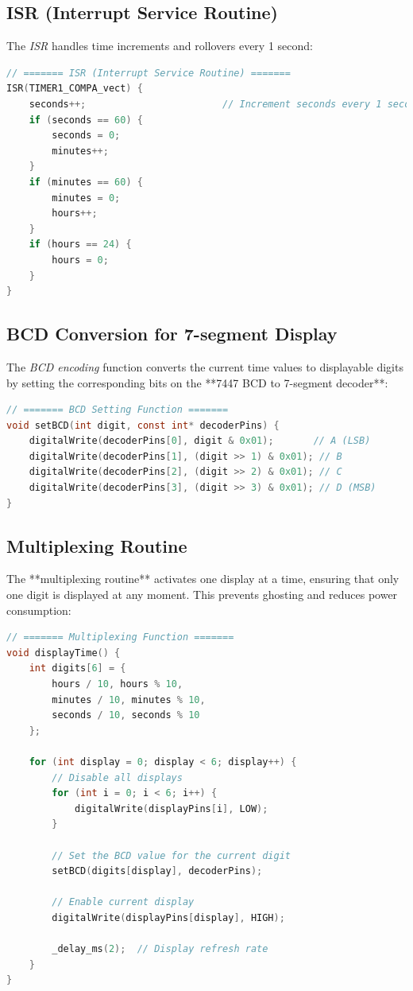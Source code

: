 \documentclass{article}
\begin{document}
\subsection{ISR (Interrupt Service Routine)}
The \textit{ISR} handles time increments and rollovers every 1 second:
\begin{lstlisting}[language=C]
// ======= ISR (Interrupt Service Routine) =======
ISR(TIMER1_COMPA_vect) {
    seconds++;                        // Increment seconds every 1 second
    if (seconds == 60) {
        seconds = 0;
        minutes++;
    }
    if (minutes == 60) {
        minutes = 0;
        hours++;
    }
    if (hours == 24) {
        hours = 0;
    }
}
\end{lstlisting}

\subsection{BCD Conversion for 7-segment Display}
The \textit{BCD encoding} function converts the current time values to displayable digits by setting the corresponding bits on the **7447 BCD to 7-segment decoder**:
\begin{lstlisting}[language=C]
// ======= BCD Setting Function =======
void setBCD(int digit, const int* decoderPins) {
    digitalWrite(decoderPins[0], digit & 0x01);       // A (LSB)
    digitalWrite(decoderPins[1], (digit >> 1) & 0x01); // B
    digitalWrite(decoderPins[2], (digit >> 2) & 0x01); // C
    digitalWrite(decoderPins[3], (digit >> 3) & 0x01); // D (MSB)
}
\end{lstlisting}

\subsection{Multiplexing Routine}
The **multiplexing routine** activates one display at a time, ensuring that only one digit is displayed at any moment. This prevents ghosting and reduces power consumption:
\begin{lstlisting}[language=C]
// ======= Multiplexing Function =======
void displayTime() {
    int digits[6] = {
        hours / 10, hours % 10, 
        minutes / 10, minutes % 10, 
        seconds / 10, seconds % 10
    };

    for (int display = 0; display < 6; display++) {
        // Disable all displays
        for (int i = 0; i < 6; i++) {
            digitalWrite(displayPins[i], LOW);
        }

        // Set the BCD value for the current digit
        setBCD(digits[display], decoderPins);

        // Enable current display
        digitalWrite(displayPins[display], HIGH);

        _delay_ms(2);  // Display refresh rate
    }
}
\end{lstlisting}
\end{document}
